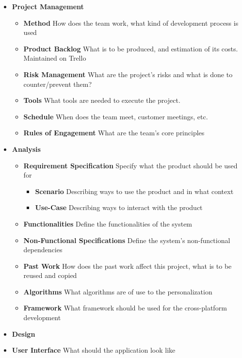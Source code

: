 \begin{appendices}
\begin{itemize}
	\item \textbf{Project Management}
	\begin{itemize}
		\item \textbf{Method} \newline
		How does the team work, what kind of development process is used
		\item \textbf{Product Backlog} \newline
		What is to be produced, and estimation of its costs. Maintained on Trello
		\item \textbf{Risk Management} \newline
		What are the project's risks and what is done to counter/prevent them? 
		\item \textbf{Tools} \newline
		What tools are needed to execute the project.
		\item \textbf{Schedule} \newline
		When does the team meet, customer meetings, etc.
		\item \textbf{Rules of Engagement } \newline
		What are the team’s core principles
	\end{itemize}
	\item \textbf{Analysis}
	\begin{itemize}
		\item \textbf{Requirement Specification} \newline
		Specify what the product should be used for
		\begin{itemize}
			\item \textbf{Scenario} \newline
			Describing ways to use the product and in what context
			\item \textbf{Use-Case} \newline
			Describing ways to interact with the product
			
		\end{itemize}
		\item \textbf{Functionalities} \newline
		Define the functionalities of the system
		\item \textbf{Non-Functional Specifications} \newline
		Define the system’s non-functional dependencies	
		\item \textbf{Past Work} \newline
		How does the past work affect this project, what is to be reused and copied	
		\item \textbf{Algorithms} \newline
		What algorithms are of use to the personalization	
		\item \textbf{Framework} \newline
		What framework should be used for the cross-platform development
	\end{itemize}
	\item \textbf{Design}
			\item \textbf{User Interface} \newline
			What should the application look like
			

\end{itemize}
\end{appendices}
